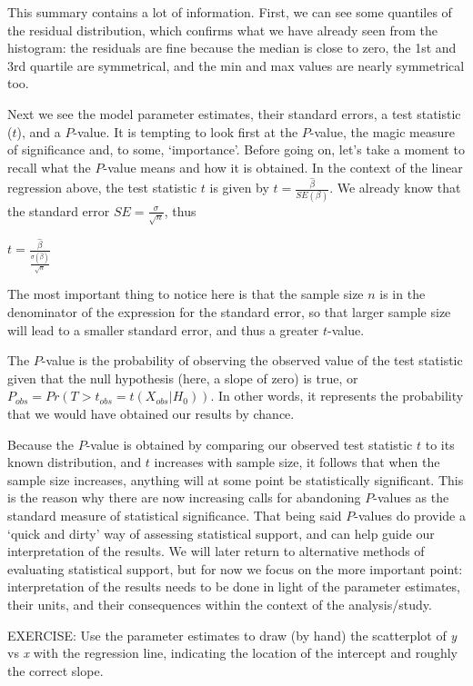 \documentclass[
]{article}
\begin{document}
This summary contains a lot of information. First, we can see some
quantiles of the residual distribution, which confirms what we have
already seen from the histogram: the residuals are fine because the
median is close to zero, the 1st and 3rd quartile are symmetrical, and
the min and max values are nearly symmetrical too.

Next we see the model parameter estimates, their standard errors, a test
statistic (\(t\)), and a \(P\)-value. It is tempting to look first at
the \(P\)-value, the magic measure of significance and, to some,
`importance'. Before going on, let's take a moment to recall what the
\(P\)-value means and how it is obtained. In the context of the linear
regression above, the test statistic \(t\) is given by
\(t = \frac{\hat{\beta}}{SE(\beta)}\). We already know that the standard
error \(SE=\frac{\sigma}{\sqrt{n}}\), thus

\(t = \frac{\hat{\beta}}{\frac{\sigma(\hat{\beta})}{\sqrt{n}}}\)

The most important thing to notice here is that the sample size \(n\) is
in the denominator of the expression for the standard error, so that
larger sample size will lead to a smaller standard error, and thus a
greater \(t\)-value.

The \(P\)-value is the probability of observing the observed value of
the test statistic given that the null hypothesis (here, a slope of
zero) is true, or \(P_{obs} = Pr(T>t_{obs}=t(X_{obs}|H_0))\). In other
words, it represents the probability that we would have obtained our
results by chance.

Because the \(P\)-value is obtained by comparing our observed test
statistic \(t\) to its known distribution, and \(t\) increases with
sample size, it follows that when the sample size increases, anything
will at some point be statistically significant. This is the reason why
there are now increasing calls for abandoning \(P\)-values as the
standard measure of statistical significance. That being said
\(P\)-values do provide a `quick and dirty' way of assessing statistical
support, and can help guide our interpretation of the results. We will
later return to alternative methods of evaluating statistical support,
but for now we focus on the more important point: interpretation of the
results needs to be done in light of the parameter estimates, their
units, and their consequences within the context of the analysis/study.

EXERCISE: Use the parameter estimates to draw (by hand) the scatterplot
of \emph{y} vs \emph{x} with the regression line, indicating the
location of the intercept and roughly the correct slope.
\end{document}
